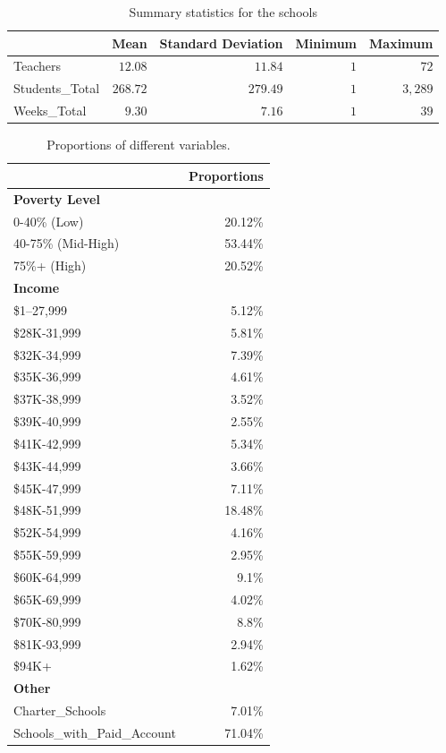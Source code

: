 \documentclass[
  number,
  preprint,
  3p,
  onecolumn]{elsarticle}
\begin{document}
\hypertarget{tbl-summary}{}
\begin{longtable}{l|rrrr}
\caption{\label{tbl-summary}Summary statistics for the schools }\tabularnewline

\toprule
\multicolumn{1}{l}{} & Mean & Standard Deviation & Minimum & Maximum \\ 
\midrule
Teachers & $12.08$ & $11.84$ & $1$ & $72$ \\ 
Students\_Total & $268.72$ & $279.49$ & $1$ & $3,289$ \\ 
Weeks\_Total & $9.30$ & $7.16$ & $1$ & $39$ \\ 
\bottomrule
\end{longtable}

\hypertarget{tbl-proportions}{}
\begin{longtable}{l|r}
\caption{\label{tbl-proportions}Proportions of different variables. }\tabularnewline

\toprule
\multicolumn{1}{l}{} & Proportions \\ 
\midrule
\textbf{Poverty Level} &  \\ 
0-40\% (Low) & 20.12\% \\ 
40-75\% (Mid-High) & 53.44\% \\ 
75\%+ (High) & 20.52\% \\ 
\textbf{Income} &  \\ 
\$1--27,999 & 5.12\% \\ 
\$28K-31,999 & 5.81\% \\ 
\$32K-34,999 & 7.39\% \\ 
\$35K-36,999 & 4.61\% \\ 
\$37K-38,999 & 3.52\% \\ 
\$39K-40,999 & 2.55\% \\ 
\$41K-42,999 & 5.34\% \\ 
\$43K-44,999 & 3.66\% \\ 
\$45K-47,999 & 7.11\% \\ 
\$48K-51,999 & 18.48\% \\ 
\$52K-54,999 & 4.16\% \\ 
\$55K-59,999 & 2.95\% \\ 
\$60K-64,999 & 9.1\% \\ 
\$65K-69,999 & 4.02\% \\ 
\$70K-80,999 & 8.8\% \\ 
\$81K-93,999 & 2.94\% \\ 
\$94K+ & 1.62\% \\ 
\textbf{Other} &  \\ 
Charter\_Schools & 7.01\% \\ 
Schools\_with\_Paid\_Account & 71.04\% \\ 
\bottomrule
\end{longtable}
\end{document}
